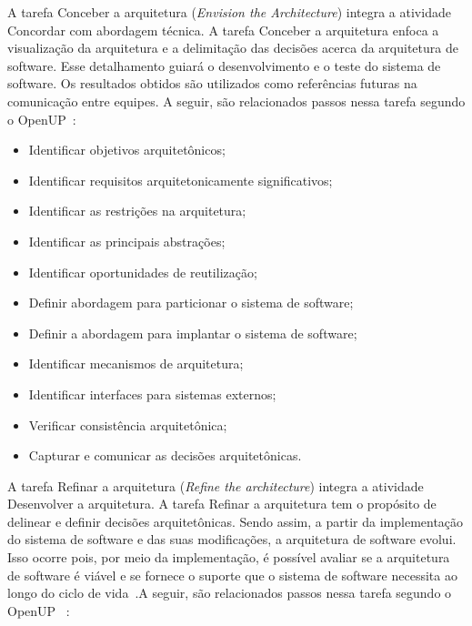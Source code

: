 %


A tarefa Conceber a arquitetura (\emph{Envision the Architecture}) integra a atividade Concordar com abordagem técnica. A tarefa Conceber a arquitetura enfoca a visualização da arquitetura e a delimitação das decisões acerca da arquitetura de software. Esse detalhamento guiará o desenvolvimento e o teste do sistema de software. Os resultados obtidos são utilizados como referências futuras na comunicação entre equipes. A seguir, são relacionados passos nessa tarefa segundo o OpenUP~\cite{openup}:

\begin{itemize}
    \item Identificar objetivos arquitetônicos;
    \item Identificar requisitos arquitetonicamente significativos;
    \item Identificar as restrições na arquitetura;
    \item Identificar as principais abstrações;
    \item Identificar oportunidades de reutilização;
    \item Definir abordagem para particionar o sistema de software;
    \item Definir a abordagem para implantar o sistema de software;
    \item Identificar mecanismos de arquitetura;
    \item Identificar interfaces para sistemas externos;
    \item Verificar consistência arquitetônica;
    \item Capturar e comunicar as decisões arquitetônicas.
\end{itemize}

A tarefa Refinar a arquitetura (\emph{Refine the architecture}) integra a atividade Desenvolver a arquitetura. A tarefa Refinar a arquitetura tem o propósito de delinear e definir decisões arquitetônicas. Sendo assim, a partir da implementação do sistema de software e das suas modificações, a arquitetura de software evolui. Isso ocorre pois, por meio da implementação, é possível avaliar se a arquitetura de software é viável e se fornece o suporte que o sistema de software necessita ao longo do ciclo de vida~\cite{openup}.A seguir, são relacionados passos nessa tarefa segundo o OpenUP ~\cite{openup}:

